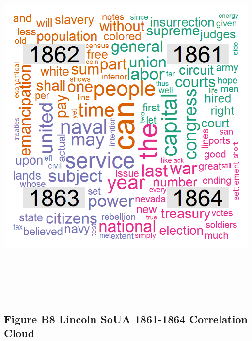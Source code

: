\documentclass[]{article}
\begin{document}
\includegraphics[height=7.29167in]{images/Lincolndata_compcloud.png}

\subsection{Figure B8 Lincoln SoUA 1861-1864 Correlation
Cloud}\label{figure-b8-lincoln-soua-1861-1864-correlation-cloud}
\end{document}
